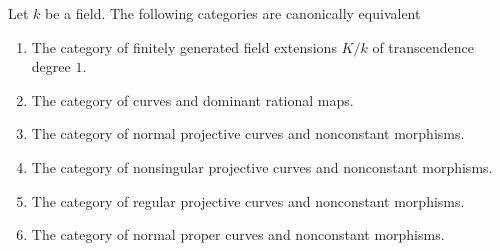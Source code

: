 \begin{theorem}
\label{theorem-curves-rational-maps}
Let $k$ be a field. The following categories are canonically equivalent
\begin{enumerate}
\item The category of finitely generated field extensions $K/k$ of
transcendence degree $1$.
\item The category of curves and dominant rational maps.
\item The category of normal projective curves and nonconstant morphisms.
\item The category of nonsingular projective curves and nonconstant morphisms.
\item The category of regular projective curves and nonconstant morphisms.
\item The category of normal proper curves and nonconstant morphisms.
\end{enumerate}
\end{theorem}

